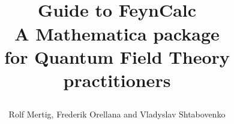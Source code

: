 \documentclass[11pt,a4paper]{report}
\begin{document}
\newcommand{\len}{0pt}
\newcommand{\ind}{\leftskip \len}
\newcommand{\mcode}[1]{
\parbox{0.8\textwidth}{
\setlength{\leftskip}{\len}
\mb{\textbf{ \\ #1 \\ }}
}
}

\renewcommand{\thesection}{\arabic{section}}
\renewcommand{\thechapter}{\arabic{chapter}}

\allsectionsfont{\sffamily}
\sectionfont{\huge \sffamily}


\newcommand{\fname}[1]{
  $\blacksquare$ \ \ {\large\mb{#1}}
  \begin{quote}
}
\newcommand{\fheading}[1]{
\setlength{\leftskip}{4pt}
}
\newcommand{\fusage}[1]{#1\vspace*{10pt}\newline}
\newcommand{\fnotes}[1]{
\setlength{\parindent}{0pt}
\setlength{\parskip}{0pt}
#1}
\newcommand{\ftabtwo}[1]{
\begin{longtable}[H]{p{0.3\textwidth} p{0.54\textwidth
}}
#1
\end{longtable}
}
\newcommand{\ftabthree}[1]{
\renewcommand{\arraystretch}{0.8}
\renewcommand{\arraycolsep}{0}
\begin{longtable}[H]{p{0.23\textwidth} p{0.1\textwidth} p{0.5\textwidth}}
#1
\end{longtable}
}
\newcommand{\seepage}{}
\newcommand{\ffinish}{\end{quote}}


\title{\raggedright \hspace*{1pt} \\
\vspace*{12pt}
{\huge Guide to FeynCalc}\\
\vspace*{17pt}
{\large A Mathematica package\\
for Quantum Field Theory practitioners}}
\author{\hspace*{-10pt}
\parbox{\textwidth}{\raggedright Rolf Mertig, Frederik Orellana and Vladyslav
Shtabovenko}}
\date{}
{\sffamily
\maketitle
}
\end{document}
